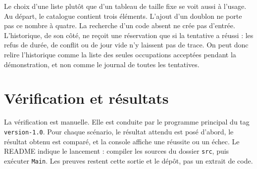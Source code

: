 \documentclass[11pt,a4paper]{article}
\begin{document}
Le choix d'une liste plutôt que d'un tableau de taille fixe se voit aussi à l'usage. Au départ, le catalogue contient trois éléments. L'ajout d'un doublon ne porte pas ce nombre à quatre. La recherche d'un code absent ne crée pas d'entrée. L'historique, de son côté, ne reçoit une réservation que si la tentative a réussi : les refus de durée, de conflit ou de jour vide n'y laissent pas de trace. On peut donc relire l'historique comme la liste des seules occupations acceptées pendant la démonstration, et non comme le journal de toutes les tentatives.

\section{Vérification et résultats}
\label{sec:verif}

La vérification est manuelle. Elle est conduite par le programme principal du tag \texttt{version-1.0}. Pour chaque scénario, le résultat attendu est posé d'abord, le résultat obtenu est comparé, et la console affiche une réussite ou un échec. Le README indique le lancement : compiler les sources du dossier \texttt{src}, puis exécuter \texttt{Main}. Les preuves restent cette sortie et le dépôt, pas un extrait de code.
\end{document}

